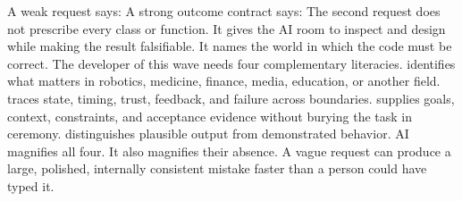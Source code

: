 \markdownRendererInterblockSeparator
{}A weak request says:\markdownRendererInterblockSeparator
{}\markdownRendererInterblockSeparator
{}A strong outcome contract says:\markdownRendererInterblockSeparator
{}\markdownRendererInterblockSeparator
{}The second request does not prescribe every class or function. It gives the AI\markdownRendererSoftLineBreak
{}room to inspect and design while making the result falsifiable. It names the\markdownRendererSoftLineBreak
{}world in which the code must be correct.\markdownRendererInterblockSeparator
{}
\markdownRendererSectionEnd \markdownRendererSectionBegin
{}\markdownRendererInterblockSeparator
{}The developer of this wave needs four complementary literacies.\markdownRendererInterblockSeparator
{}\markdownRendererOlBegin
{} identifies what matters in robotics, medicine, finance,\markdownRendererSoftLineBreak
{}media, education, or another field.\markdownRendererOlItemEnd 
{} traces state, timing, trust, feedback, and failure across\markdownRendererSoftLineBreak
{}boundaries.\markdownRendererOlItemEnd 
{} supplies goals, context, constraints, and\markdownRendererSoftLineBreak
{}acceptance evidence without burying the task in ceremony.\markdownRendererOlItemEnd 
{} distinguishes plausible output from demonstrated\markdownRendererSoftLineBreak
{}behavior.\markdownRendererOlItemEnd 
\markdownRendererOlEnd \markdownRendererInterblockSeparator
{}AI magnifies all four. It also magnifies their absence. A vague request can\markdownRendererSoftLineBreak
{}produce a large, polished, internally consistent mistake faster than a person\markdownRendererSoftLineBreak
{}could have typed it.\markdownRendererInterblockSeparator
{}\markdownRendererThematicBreak{}\markdownRendererInterblockSeparator
{}
\markdownRendererSectionEnd 
\markdownRendererSectionEnd \markdownRendererSectionBegin
